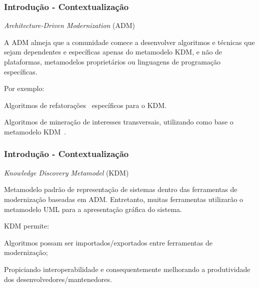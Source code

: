 \documentclass{beamer}
\begin{document}
\begin{frame}\frametitle{Introdução - Contextualização}

\begin{block}{\textit{Architecture-Driven Modernization} (ADM)}
\begin{minipage}[b]{10.80cm}
A ADM almeja que a comunidade comece a desenvolver algoritmos e técnicas que sejam dependentes e específicas apenas do metamodelo KDM, e não de plataformas, metamodelos proprietários ou linguagens de programação específicas.
\end{minipage}  
\end{block}

Por exemplo: \vspace{.35cm}

\begin{itemize}
  \begin{minipage}[b]{9.8cm}  
  \item  Algoritmos de refatorações~\cite{durelli_catalogo} específicos para o KDM.
  \vspace{.4cm}\end{minipage}
  \begin{minipage}[b]{9.8cm} 
  \item  Algoritmos de mineração de interesses transversais, utilizando como base o metamodelo KDM~\cite{Durelli:2013_ACM, dani_san, daniel_san_journal}.
  \vspace{.4cm}\end{minipage}
\end{itemize}

\end{frame}

\begin{frame}\frametitle{Introdução - Contextualização}

\begin{block}{\textit{Knowledge Discovery Metamodel} (KDM)}
\begin{minipage}[b]{10.80cm}
Metamodelo padrão de representação de sistemas  dentro das ferramentas de modernização baseadas em ADM. Entretanto, muitas ferramentas utilizarão o metamodelo UML para a apresentação gráfica do sistema.
\end{minipage}  
\end{block}

KDM permite: \vspace{.35cm}

\begin{itemize}
  \begin{minipage}[b]{9.8cm}  
  \item Algoritmos possam ser importados/exportados entre ferramentas de modernização;
  \vspace{.4cm}\end{minipage}
  \begin{minipage}[b]{9.8cm} 
  \item  Propiciando interoperabilidade e consequentemente melhorando a produtividade dos desenvolvedores/mantenedores.
  \vspace{.4cm}\end{minipage}
\end{itemize}

\end{frame}
\end{document}
